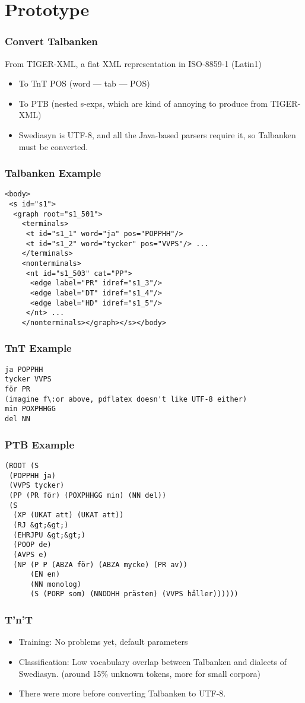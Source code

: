 \documentclass{beamer}
\begin{document}
\section{Prototype}
\begin{frame}
  \frametitle{Convert Talbanken}
  From TIGER-XML, a flat XML representation in ISO-8859-1 (Latin1)
 \begin{itemize}
  \item To TnT POS (word --- tab --- POS)
  \item To PTB (nested s-exps, which are kind of annoying to produce
    from TIGER-XML)
  \item Swediasyn is UTF-8, and all the Java-based parsers require it,
    so Talbanken must be converted.
  \end{itemize}
\end{frame}
\begin{frame}[fragile]
  \frametitle{Talbanken Example}
\begin{verbatim}
<body>
 <s id="s1">
  <graph root="s1_501">
    <terminals>
     <t id="s1_1" word="ja" pos="POPPHH"/>
     <t id="s1_2" word="tycker" pos="VVPS"/> ...
    </terminals>
    <nonterminals>
     <nt id="s1_503" cat="PP">
      <edge label="PR" idref="s1_3"/>
      <edge label="DT" idref="s1_4"/>
      <edge label="HD" idref="s1_5"/>
     </nt> ...
    </nonterminals></graph></s></body>
\end{verbatim}
\end{frame}
\begin{frame}[fragile]
  \frametitle{TnT Example}
\begin{verbatim}
ja POPPHH
tycker VVPS
för PR
(imagine f\:or above, pdflatex doesn't like UTF-8 either)
min POXPHHGG
del NN
\end{verbatim}
\end{frame}
\begin{frame}[fragile]
  \frametitle{PTB Example}
\begin{verbatim}
(ROOT (S
 (POPPHH ja)
 (VVPS tycker)
 (PP (PR för) (POXPHHGG min) (NN del))
 (S
  (XP (UKAT att) (UKAT att))
  (RJ &gt;&gt;)
  (EHRJPU &gt;&gt;)
  (POOP de)
  (AVPS e)
  (NP (P P (ABZA för) (ABZA mycke) (PR av))
      (EN en)
      (NN monolog)
      (S (PORP som) (NNDDHH prästen) (VVPS håller))))))
\end{verbatim}
\end{frame}
\begin{frame}
  \frametitle{T'n'T}
  \begin{itemize}
  \item Training: No problems yet, default parameters
  \item Classification: Low vocabulary overlap between Talbanken and
    dialects of Swediasyn. (around 15\% unknown tokens, more for small
    corpora)
  \item There were more before converting Talbanken to UTF-8.
  \end{itemize}
\end{frame}
\end{document}
